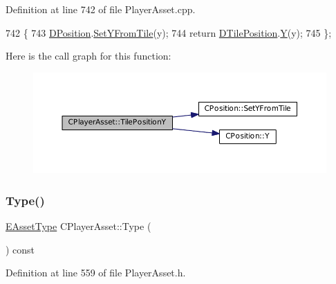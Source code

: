 Definition at line 742 of file Player\+Asset.\+cpp.


\begin{DoxyCode}
742                                     \{
743     \hyperlink{classCPlayerAsset_aa9f53c009b181c7c5647c6b03776a04c}{DPosition}.\hyperlink{classCPosition_a4be1caa5ce58297e9d371f6bc1db32d9}{SetYFromTile}(y);
744     \textcolor{keywordflow}{return} \hyperlink{classCPlayerAsset_a5b59a9d3b7db8c7fa194b80dafb96186}{DTilePosition}.\hyperlink{classCPosition_a1aa8a30e2f08dda1f797736ba8c13a87}{Y}(y);
745 \};
\end{DoxyCode}
Here is the call graph for this function\+:\nopagebreak
\begin{figure}[H]
\begin{center}
\leavevmode
\includegraphics[width=350pt]{classCPlayerAsset_ad3ce562cbd27e2c35abe968a7ff19cd6_cgraph}
\end{center}
\end{figure}
\hypertarget{classCPlayerAsset_a6d6aeea4e8b02e0f239bac95db6d9e0a}{}\label{classCPlayerAsset_a6d6aeea4e8b02e0f239bac95db6d9e0a} 
\subsubsection{\texorpdfstring{Type()}{Type()}}
{\footnotesize\ttfamily \hyperlink{GameDataTypes_8h_a5600d4fc433b83300308921974477fec}{E\+Asset\+Type} C\+Player\+Asset\+::\+Type (\begin{DoxyParamCaption}{ }\end{DoxyParamCaption}) const\hspace{0.3cm}{\ttfamily [inline]}}



Definition at line 559 of file Player\+Asset.\+h.


